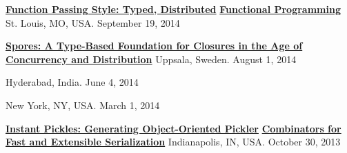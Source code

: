 \documentclass[9pt]{article}
\begin{document}
\noindent\href{https://speakerdeck.com/heathermiller/function-passing-style-typed-distributed-functional-programming}{\bf Function Passing Style: Typed, Distributed} \vspace{-0.03in}
\linebreak\noindent\href{https://speakerdeck.com/heathermiller/function-passing-style-typed-distributed-functional-programming}{\bf Functional Programming}\dates{}
\linebreak\noindent St. Louis, MO, USA. September 19, 2014
\bigskip


\noindent\href{https://speakerdeck.com/heathermiller/spores-a-type-based-foundation-for-closures-in-the-age-of-concurrency-and-distribution}{\bf Spores: A Type-Based Foundation for Closures in the Age of} \vspace{-0.03in}
\linebreak\noindent\href{https://speakerdeck.com/heathermiller/spores-a-type-based-foundation-for-closures-in-the-age-of-concurrency-and-distribution}{\bf Concurrency and Distribution}\dates{}
\linebreak\noindent Uppsala, Sweden. August 1, 2014
\bigskip

 \vspace{-0.03in}
\linebreak{}\dates{}
\linebreak\noindent Hyderabad, India. June 4, 2014
\bigskip

 \vspace{-0.03in}
\linebreak{}\dates{}
\linebreak\noindent New York, NY, USA. March 1, 2014
\bigskip

\noindent\href{https://speakerdeck.com/heathermiller/instant-pickles-generating-object-oriented-pickler-combinators-for-fast-and-extensible-serialization}{\bf Instant Pickles: Generating Object-Oriented Pickler} \vspace{-0.03in}
\linebreak\noindent\href{https://speakerdeck.com/heathermiller/instant-pickles-generating-object-oriented-pickler-combinators-for-fast-and-extensible-serialization}{\bf Combinators for Fast and Extensible Serialization}\dates{}
\linebreak\noindent Indianapolis, IN, USA. October 30, 2013
\bigskip
\end{document}

